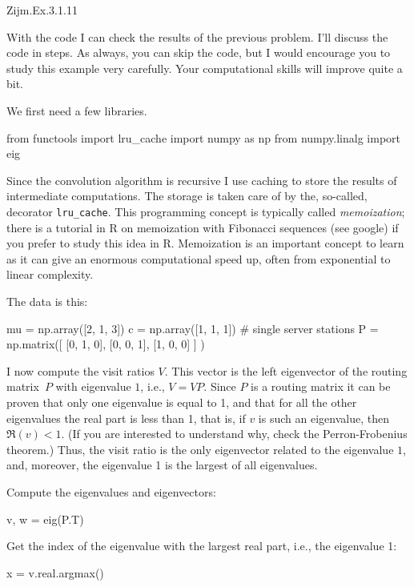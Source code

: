 \begin{exercise}
Zijm.Ex.3.1.11
\begin{solution}
  With the code I can check the results of the previous problem.  I'll
  discuss the code in steps. As always, you can skip the code, but I
  would encourage you to study this example very carefully. Your
  computational skills will improve quite a bit. 

We first need a few libraries. 

\begin{pyconsole}
from functools import lru_cache
import numpy as np
from numpy.linalg import eig
  
\end{pyconsole}

Since the convolution algorithm is recursive I use caching to store
the results of intermediate computations. The storage is taken care of
by the, so-called, decorator \texttt{lru\_cache}. This programming
concept is typically called \emph{memoization}; there is a tutorial in
R on memoization with Fibonacci sequences (see google) if you prefer
to study this idea in R. Memoization is an important concept to learn
as it can give an enormous computational speed up, often from
exponential to linear complexity.

The data is this:

\begin{pyconsole}
mu = np.array([2, 1, 3])
c = np.array([1, 1, 1]) # single server stations
P = np.matrix([
    [0, 1, 0],
    [0, 0, 1],
    [1, 0, 0]
]
)
  
\end{pyconsole}

I now compute the visit ratios $V$. This vector is the left
eigenvector of the routing matrix~$P$ with eigenvalue $1$, i.e.,
$V=VP$. Since $P$ is a routing matrix it can be proven that only one
eigenvalue is equal to 1, and that for all the other eigenvalues the
real part is less than 1, that is, if $v$ is such an eigenvalue, then
$\Re(v) < 1$. (If you are interested to understand why, check
the Perron-Frobenius theorem.) Thus, the visit ratio is the only
eigenvector related to the eigenvalue $1$, and, moreover, the
eigenvalue 1 is the largest of all eigenvalues.

Compute the eigenvalues and eigenvectors:

\begin{pyconsole}
v, w = eig(P.T)
\end{pyconsole}

Get the index of the  eigenvalue with the largest real part, i.e., the  eigenvalue 1:
\begin{pyconsole}
x = v.real.argmax() 
\end{pyconsole}


\end{solution}
\end{exercise}
